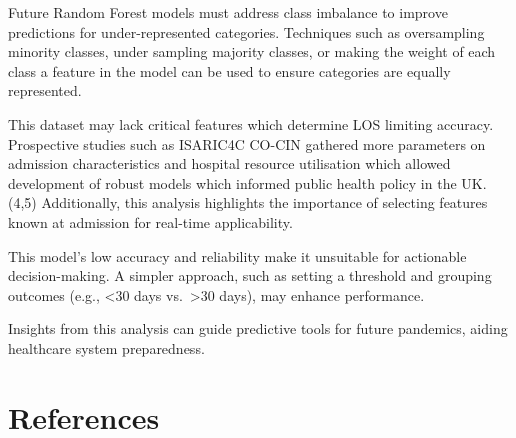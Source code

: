 \documentclass[
]{article}
\begin{document}
Future Random Forest models must address class imbalance to improve
predictions for under-represented categories. Techniques such as
oversampling minority classes, under sampling majority classes, or
making the weight of each class a feature in the model can be used to
ensure categories are equally represented.

This dataset may lack critical features which determine LOS limiting
accuracy. Prospective studies such as ISARIC4C CO-CIN gathered more
parameters on admission characteristics and hospital resource
utilisation which allowed development of robust models which informed
public health policy in the UK.(4,5) Additionally, this analysis
highlights the importance of selecting features known at admission for
real-time applicability.

This model's low accuracy and reliability make it unsuitable for
actionable decision-making. A simpler approach, such as setting a
threshold and grouping outcomes (e.g., \textless30 days
vs.~\textgreater30 days), may enhance performance.

Insights from this analysis can guide predictive tools for future
pandemics, aiding healthcare system preparedness.

\section{References}\label{references}
\end{document}
